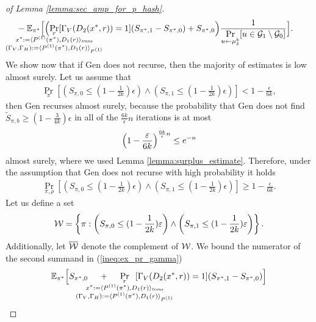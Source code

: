 \begin{proof}[of Lemma \ref{lemma:sec_amp_for_p_hash}]
\begin{align}
&- \mathbb{E}_{\pi^*}\Bigl[\Bigl(
\underset{\mathclap{
  \substack{r \\ x^* := \langle P^{(1)}(\pi^*), D_1(r) \rangle_{\mathit{trans}} \\ (\Gamma_V, \Gamma_H) := \langle P^{(1)}(\pi^*), D_1(r) \rangle_{P^{(1)}} }}}
{\Pr}[\Gamma_V(D_2(x^*, r)) = 1](S_{\pi^*,1} - S_{\pi^*,0})
 + S_{\pi^*,0}\Bigr)
\frac{1}{\underset{u \leftarrow \mu_{\delta}^k}{\Pr}[ u \in \cG_1 \setminus\cG_0]}\Bigr].
\end{align}
We show now that if Gen does not recurse, then the majority of estimates is low almost surely.
Let us assume that
\begin{align}
\underset{\pi}{\Pr}\left[\left(S_{\pi,0} \leq (1 - \frac{1}{2k})\epsilon\right) \land \left( S_{\pi,1} \leq (1-\frac{1}{2k})\epsilon\right)\right] < 1 - \frac{\epsilon}{6k},
\end{align}
then Gen recurses almost surely, because the probability that
Gen does not find $\widetilde{S}_{\pi, b} \geq (1-\frac{3}{4k})\epsilon$ in all of the $\frac{6k}{\epsilon}n$ iterations is at most
\begin{align*}
  \Bigl(1 - \frac{\epsilon}{6k}\Bigr)^{\frac{6k}{\epsilon}n} \leq e^{-n}
\end{align*}
almost surely, where we used Lemma \ref{lemma:surplus_estimate}.
Therefore, under the assumption that Gen does not recurse with high probability it holds
\begin{align}
\underset{\pi, \rho}{\Pr}\left[\left(S_{\pi,0} \leq (1 - \frac{1}{2k})\epsilon\right) \land \left( S_{\pi,1} \leq (1-\frac{1}{2k})\epsilon\right)\right] \geq 1 - \frac{\epsilon}{6k}.
\end{align}
Let us define a set
\begin{align}
  \cW = \left\{ \pi :  \left(S_{\pi,0} \leq (1 - \frac{1}{2k})\epsilon\right) \land \left( S_{\pi,1} \leq (1-\frac{1}{2k})\epsilon \right) \right\}.
\end{align}
Additionally, let $\overline{\cW}$ denote the complement of $\cW$.
We bound the numerator of the second summand in (\ref{ineq:ex_pr_gamma})
\begin{align}
  \label{ineq:second_eq}
&\mathbb{E}_{\pi^*}\Big[ S_{\pi^*,0}
\mkern23mu
+
\mkern23mu
\underset{
  \mathclap{
  \substack{r \\ x^* := \langle P^{(1)}(\pi^*), D_1(r) \rangle_{\mathit{trans}}
    \\ (\Gamma_V, \Gamma_H) := \langle P^{(1)}(\pi^*), D_1 (r) \rangle_{P^{(1)}} }}}
{\Pr}\mkern13mu[\Gamma_V(D_2(x^*, r)) = 1]
(S_{\pi^*,1} - S_{\pi^*,0})\Big] \notag\\

\end{align}
\end{proof}
